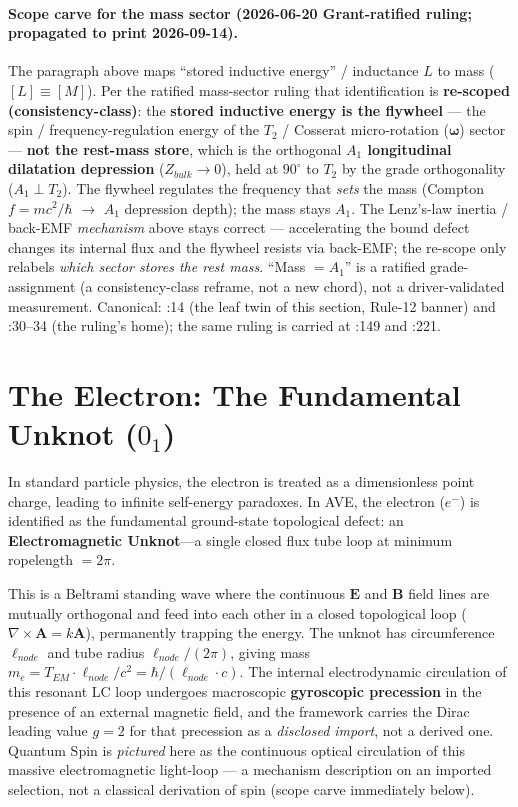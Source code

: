 \paragraph{Scope carve for the mass sector (2026-06-20 Grant-ratified ruling; propagated to print 2026-09-14).} The paragraph above maps ``stored inductive energy'' / inductance $L$ to mass ($[L] \equiv [M]$). Per the ratified mass-sector ruling that identification is \textbf{re-scoped (consistency-class)}: the \textbf{stored inductive energy is the flywheel} --- the spin / frequency-regulation energy of the $T_2$ / Cosserat micro-rotation ($\boldsymbol{\omega}$) sector --- \textbf{not the rest-mass store}, which is the orthogonal \textbf{$A_1$ longitudinal dilatation depression} ($Z_{bulk} \to 0$), held at $90^\circ$ to $T_2$ by the grade orthogonality ($A_1 \perp T_2$). The flywheel regulates the frequency that \emph{sets} the mass (Compton $f = mc^2/\hbar$ $\to$ $A_1$ depression depth); the mass stays $A_1$. The Lenz's-law inertia / back-EMF \emph{mechanism} above stays correct --- accelerating the bound defect changes its internal flux and the flywheel resists via back-EMF; the re-scope only relabels \emph{which sector stores the rest mass}. ``Mass $= A_1$'' is a ratified grade-assignment (a consistency-class reframe, not a new chord), not a driver-validated measurement. Canonical: :14 (the leaf twin of this section, Rule-12 banner) and :30--34 (the ruling's home); the same ruling is carried at :149 and :221.
\section{The Electron: The Fundamental Unknot ($0_1$)}
In standard particle physics, the electron is treated as a dimensionless point charge, leading to infinite self-energy paradoxes. In AVE, the electron ($e^-$) is identified as the fundamental ground-state topological defect: an \textbf{Electromagnetic Unknot}---a single closed flux tube loop at minimum ropelength $= 2\pi$. 

This is a Beltrami standing wave where the continuous $\mathbf{E}$ and $\mathbf{B}$ field lines are mutually orthogonal and feed into each other in a closed topological loop ($\nabla \times \mathbf{A} = k\mathbf{A}$), permanently trapping the energy. The unknot has circumference $\ell_{node}$ and tube radius $\ell_{node}/(2\pi)$, giving mass $m_e = T_{EM} \cdot \ell_{node}/c^2 = \hbar/(\ell_{node} \cdot c)$. The internal electrodynamic circulation of this resonant LC loop undergoes macroscopic \textbf{gyroscopic precession} in the presence of an external magnetic field, and the framework carries the Dirac leading value $g = 2$ for that precession as a \emph{disclosed import}, not a derived one. Quantum Spin is \emph{pictured} here as the continuous optical circulation of this massive electromagnetic light-loop --- a mechanism description on an imported selection, not a classical derivation of spin (scope carve immediately below).

